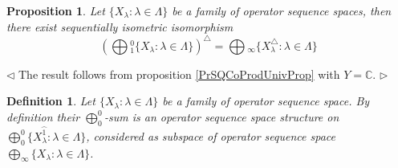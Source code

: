 \documentclass[12pt]{article}
\newtheorem{proposition}[theorem]{Proposition}
\newtheorem{definition}[theorem]{Definition}
\newenvironment{proof}{\par $\triangleleft$}{$\triangleright$}
\begin{document}
\begin{proposition}\label{PrDualOfCoprodIsProd}
Let $\{X_\lambda:\lambda\in \Lambda\}$ be a family of operator sequence spaces, then there exist sequentially isometric isomorphism
$$
\left(\bigoplus{}_1^0\{X_\lambda:\lambda\in \Lambda\}\right)^\triangle
=\bigoplus{}_\infty\{X_\lambda^\triangle:\lambda\in \Lambda\}
$$
\end{proposition}
\begin{proof}
The result follows from proposition \ref{PrSQCoProdUnivProp} with $Y=\mathbb{C}$.
\end{proof}

\begin{definition}\label{DefSQc0Sum}
Let $\{X_\lambda: \lambda \in \Lambda\}$ be a family of operator sequence space. By definition their $\bigoplus_0^0$-sum  is an operator sequence space structure on $\bigoplus_0^0\{X_\lambda^{\wideparen{1}}:\lambda\in \Lambda\}$, considered as subspace of operator sequence space $\bigoplus_\infty\{X_\lambda:\lambda\in \Lambda\}$.
\end{definition}
\end{document}
